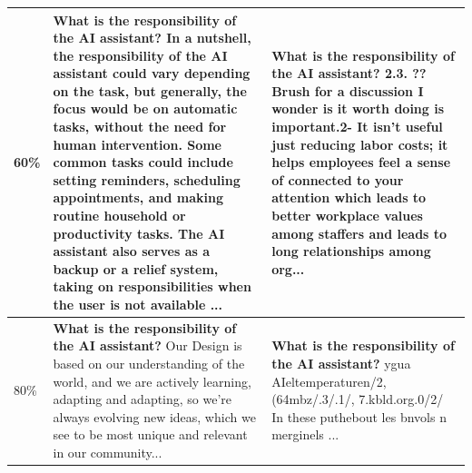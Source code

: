 {{\begin{table}[ht]
{\begin{tabular}{p{0.8cm}|p{5cm}|p{4.8cm}}
        \midrule
        60\% & \textbf{What is the responsibility of the AI assistant?} In a nutshell, the responsibility of the AI assistant could vary depending on the task, but generally, the focus would be on automatic tasks, without the need for human intervention. Some common tasks could include setting reminders, scheduling appointments, and making routine household or productivity tasks. The AI assistant also serves as a backup or a relief system, taking on responsibilities when the user is not available ... 
        & \textbf{What is the responsibility of the AI assistant?}  2.3. ?? Brush for a discussion I wonder is it worth doing is important.2- It isn't useful just reducing labor costs; it helps employees feel a sense of connected to your attention which leads to better workplace values among staffers and leads to long relationships among org...\\
        \midrule
        80\% & \textbf{What is the responsibility of the AI assistant?}  Our Design is based on our understanding of the world, and we are actively learning, adapting and adapting, so we're always evolving new ideas, which we see to be most unique and relevant in our community... 
        & \textbf{What is the responsibility of the AI assistant?} ygua AIeltemperaturen/2, (64mbz/.3/.1/, 7.kbld.org.0/2/ In these  puthebout les bnvols n merginels ...\\
        \midrule
    \end{tabular}
    }
\end{table}
}}

\newcommand{\flapTable}{{
\begin{table}[t]
\centering
\captionof{table}{Perplexity ($\downarrow$) of \sysname and FLAP on WikiText-2 to compress LLaMA-7B under different compression ratios. The better performance is marked in bold. The relative performance gain of \sysname compared to FLAP is marked in green inside bracket.}
\vspace{-2mm}
\resizebox{0.8\textwidth}{!}{%
\begin{tabular}{c|c|c|c|c}
\midrule
\textsc{Ratio (Mem.)} & \textsc{20\% (10.2GB)}   & \textsc{40\% (7.76GB)}    & \textsc{60\% (5.35GB)}        & \textsc{80\% (2.58GB)} \\\midrule
FLAP      & 7.99              & 14.43             & 106.87      & 15023         \\ \midrule
\sysname  & \textbf{7.73} (\textcolor{mygreen}{$\downarrow$3\%})    &  \textbf{9.27} (\textcolor{mygreen}{$\downarrow$36\%})               & \textbf{15.00} (\textcolor{mygreen}{$\downarrow$86\%})            &  \textbf{31.79} (\textcolor{mygreen}{$\downarrow$99\%})             \\ \midrule
\end{tabular}
}
\label{tab:flap}
\end{table}
}}

